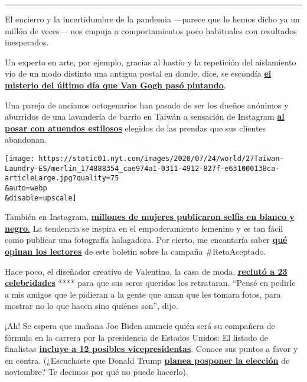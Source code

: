 \begin{center}\rule{0.5\linewidth}{\linethickness}\end{center}

El encierro y la incertidumbre de la pandemia ---parece que lo hemos
dicho ya un millón de veces--- nos empuja a comportamientos poco
habituales con resultados inesperados.

Un experto en arte, por ejemplo, gracias al hastío y la repetición del
aislamiento vio de un modo distinto una antigua postal en donde, dice,
se escondía
\textbf{\href{https://www.nytimes.com/es/2020/07/29/espanol/cultura/vincent-van-gogh-raices-arbol.html}{el
misterio del último día que Van Gogh pasó pintando}}.

Una pareja de ancianos octogenarios han pasado de ser los dueños
anónimos y aburridos de una lavandería de barrio en Taiwán a sensación
de Instagram
\textbf{\href{https://www.nytimes.com/es/2020/07/28/espanol/mundo/lavanderia-taiwanesa-instagram.html}{al
posar con atuendos estilosos}} elegidos de las prendas que sus clientes
abandonan.

\texttt{[image: https://static01.nyt.com/images/2020/07/24/world/27Taiwan-Laundry-ES/merlin\_174888354\_cae974a1-0311-4912-827f-e631000138ca-articleLarge.jpg?quality=75\\\&auto=webp\\\&disable=upscale]}

También en Instagram,
\textbf{\href{https://www.nytimes.com/es/2020/07/28/espanol/estilos-de-vida/reto-selfi-blanco-negro.html}{millones
de mujeres publicaron selfis en blanco y
negro}}\href{https://www.nytimes.com/es/2020/07/28/espanol/estilos-de-vida/reto-selfi-blanco-negro.html}{.}
La tendencia se inspira en el empoderamiento femenino y es tan fácil
como publicar una fotografía halagadora. Por cierto, me encantaría saber
\textbf{\href{https://www.nytimes.com/es/2020/07/28/espanol/estilos-de-vida/reto-selfi-blanco-negro.html\#commentsContainer}{qué
opinan los lectores}} de este boletín sobre la campaña \#RetoAceptado.

Hace poco, el diseñador creativo de Valentino, la casa de moda,
\textbf{\href{https://www.nytimes.com/es/2020/07/25/espanol/estilos-de-vida/gwyneth-paltrow-valentino.html}{reclutó
a 23 celebridades}} **** para que sus seres queridos los retrataran.
``Pensé en pedirle a mis amigos que le pidieran a la gente que aman que
les tomara fotos, para mostrar no lo que hacen sino quiénes son'', dijo.

¡Ah! Se espera que mañana Joe Biden anuncie quién será su compañera de
fórmula en la carrera por la presidencia de Estados Unidos: El listado
de finalistas
\textbf{\href{https://www.nytimes.com/es/2020/07/29/espanol/estados-unidos/biden-vicepresidente.html}{incluye
a 12 posibles vicepresidentas}}. Conoce sus puntos a favor y en contra.
(¿Escuchaste que Donald Trump
\textbf{\href{https://www.nytimes.com/es/2020/07/30/espanol/estados-unidos/trump-retrasar-elecciones.html}{planea
posponer la elección}} de noviembre? Te decimos por qué no puede
hacerlo).

